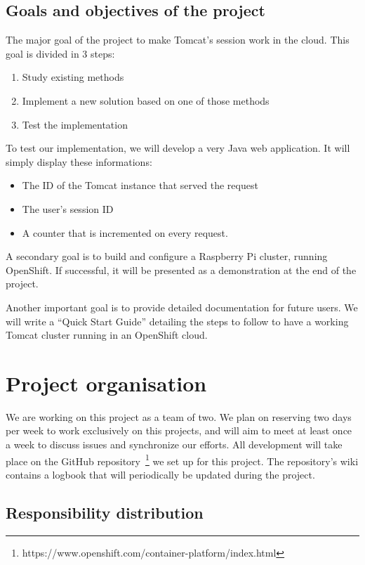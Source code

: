 \documentclass[11pt,a4paper]{article}
\begin{document}
\subsection{Goals and objectives of the project}

The major goal of the project to make Tomcat's session work in the cloud. This
goal is divided in 3 steps:
\begin{enumerate}
    \item Study existing methods
    \item Implement a new solution based on one of those methods
    \item Test the implementation
\end{enumerate}

To test our implementation, we will develop a very Java web application. It
will simply display these informations:

\begin{itemize}
    \item The ID of the Tomcat instance that served the request
    \item The user's session ID
    \item A counter that is incremented on every request.
\end{itemize}

A secondary goal is to build and configure a Raspberry Pi cluster, running
OpenShift. If successful, it will be presented as a demonstration at the end of
the project.

Another important goal is to provide detailed documentation for future users.
We will write a ``Quick Start Guide'' detailing the steps to follow to have a
working Tomcat cluster running in an OpenShift cloud.


\section{Project organisation}

We are working on this project as a team of two. We plan on reserving two days
per week to work exclusively on this projects, and will aim to meet at least
once a week to discuss issues and synchronize our efforts. All development will
take place on the GitHub
repository~\footnote{https://www.openshift.com/container-platform/index.html}
we set up for this project. The repository's wiki contains a logbook that will
periodically be updated during the project.

\subsection{Responsibility distribution}
\end{document}
